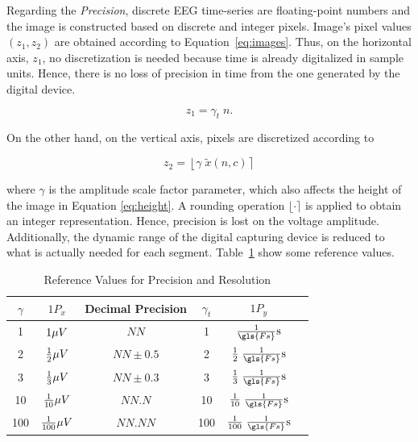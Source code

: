 Regarding the \textit{Precision}, discrete EEG time-series are floating-point numbers and the image is constructed based on discrete and integer pixels.  Image's pixel values $(z_1,z_2)$ are obtained according to Equation~\ref{eq:images}.  Thus, on the horizontal axis, $z_1$, no discretization is needed because time is already digitalized in sample units. Hence, there is no loss of precision in time from the one generated by the digital device.

\begin{equation}
z_1 = \gamma_t  \; n.
\label{eq:horizontalpixelation}
\end{equation}

On the other hand, on the vertical axis, pixels are discretized according to

\begin{equation}
z_2 = \left \lfloor{ \gamma  \; \tilde{x}(n,c)  }\right \rceil
\label{eq:verticalpixelation}
\end{equation}

\noindent where $\gamma$ is the amplitude scale factor parameter, which also affects the height of the image in Equation \ref{eq:height}. A rounding operation $\lfloor  \cdot \rceil$ is applied to obtain an integer representation.  Hence, precision is lost on the voltage amplitude. Additionally, the dynamic range of the digital capturing device is reduced to what is actually needed for each segment.  Table~\ref{tab:precision} show some reference values.

\begin{table}[htb]
\caption[Reference Values for Precision and Resolution]{Reference Values for Precision and Resolution}
\centering
\vspace{4pt}
\begin{tabular}{c|c|c||c|c|c}
\toprule
\textbf{$\gamma$}	&  $1 P_x$ 	&  Decimal Precision & \textbf{$\gamma_t$}	&  $1 P_y$  \\
\midrule
1     &     $1 \si\mu{V}$   &  $NN$                               & 1    &     $\frac{1}{\gls{Fs}} \si{s}$    \\
2    &     $\frac{1}{2} \si\mu{V}$   &  $NN \pm 0.5$  & 2    &     $\frac{1}{2} \; \frac{1}{\gls{Fs}} \si{s}$    \\
3     &     $\frac{1}{3} \si\mu{V}$   &  $NN\pm 0.3$  & 3    &     $\frac{1}{3} \;  \frac{1}{\gls{Fs}} \si{s}$    \\
10     &     $\frac{1}{10} \si\mu{V}$   &  $NN.N$        & 10   &     $\frac{1}{10} \; \frac{1}{\gls{Fs}} \si{s}$    \\
100     &     $\frac{1}{100} \si\mu{V}$   &  $NN.NN$ & 100 &     $\frac{1}{100} \; \frac{1}{\gls{Fs}} \si{s}$    \\
\bottomrule
\end{tabular}
\label{tab:precision}
\end{table}
